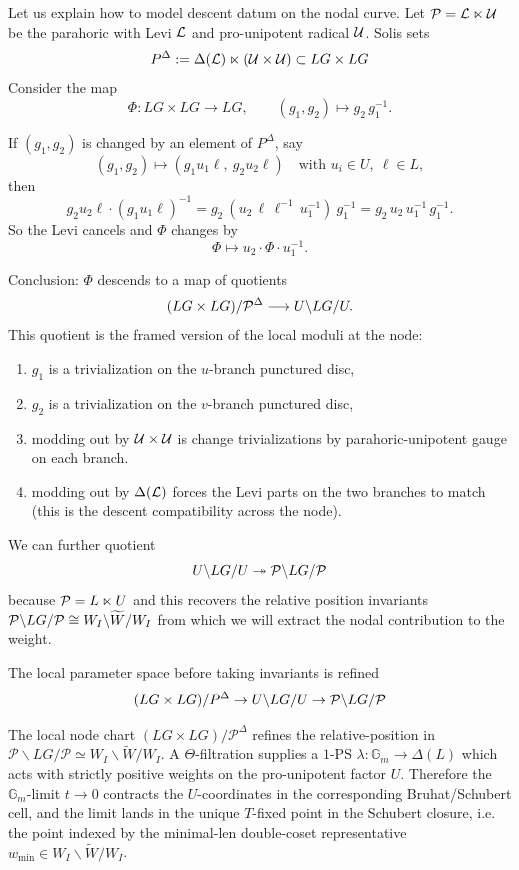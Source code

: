 \documentclass[12pt]{article}
\begin{document}
Let us explain how to model descent datum on the nodal curve. 
Let ${\mathcal{P}}= {\mathcal{L}}\ltimes {\mathcal{U}}$ be the parahoric with Levi ${\mathcal{L}}$ and pro-unipotent radical ${\mathcal{U}}$. Solis sets
\[
P^\Delta := \Delta({\mathcal{L}}) \ltimes ({\mathcal{U}}\times {\mathcal{U}}) \subset LG\times LG\]
Consider the map
\[
\Phi: LG\times LG \longrightarrow LG, \qquad (g_1,g_2)\longmapsto g_2\,g_1^{-1}.
\]

If $(g_1,g_2)$ is changed by an element of $P^\Delta$, say
\[
(g_1,g_2)\mapsto (g_1 u_1 \ell,\ g_2 u_2 \ell)
\quad\text{with }u_i\in U,\ \ell\in L,
\]
then
\[
g_2 u_2 \ell \cdot (g_1 u_1 \ell)^{-1}
=
g_2\ (u_2 \,\ell\,\ell^{-1}\,u_1^{-1})\ g_1^{-1}
=
g_2\,u_2\,u_1^{-1}\,g_1^{-1}.
\]
So the Levi cancels and $\Phi$ changes by
\[
\Phi \mapsto u_2\cdot \Phi \cdot u_1^{-1}.
\]

Conclusion: $\Phi$ descends to a map of quotients
\[
(LG\times LG)/{\mathcal{P}}^\Delta \longrightarrow U\backslash LG/U.
\]
This quotient is the framed version of the local moduli at the node:
\begin{enumerate}
    \item $g_1$ is a trivialization on the $u$-branch punctured disc,
    \item $g_2$ is a trivialization on the $v$-branch punctured disc,
    \item modding out by ${\mathcal{U}}\times{\mathcal{U}}$ is change trivializations by parahoric-unipotent gauge on each branch.
    \item modding out by $\Delta({\mathcal{L}})$ forces the Levi parts on the two branches to match (this is the descent compatibility across the node).
\end{enumerate}



We can further quotient
\[
U\backslash LG/U \twoheadrightarrow {\mathcal{P}}\backslash LG/{\mathcal{P}}
\]
because ${\mathcal{P}}=L\ltimes U$ and this recovers the relative position invariants ${\mathcal{P}}\backslash LG/{\mathcal{P}} \cong W_I\backslash \widetilde{W}/W_I$ from which we will extract the nodal contribution to the weight.

The local parameter space before taking invariants is refined
\[(LG\times LG)/P^\Delta \to U\backslash LG/U \to {\mathcal{P}}\backslash LG/{\mathcal{P}}\]

The local node chart $(LG\times LG)/\mathcal{P}^\Delta$ refines the relative-position in $\mathcal{P}\backslash LG/\mathcal{P}\simeq W_I\backslash\widetilde{W}/W_I$. A $\Theta$-filtration supplies a $1$-PS $\lambda:\mathbb{G}_m\to \Delta(L)$ which acts with strictly positive weights on the pro-unipotent factor $U$. Therefore the $\mathbb{G}_m$-limit $t\to 0$ contracts the $U$-coordinates in the corresponding Bruhat/Schubert cell, and the limit lands in the unique $T$-fixed point in the Schubert closure, i.e. the point indexed by the minimal-len double-coset representative $w_{\min}\in W_I\backslash\widetilde{W}/W_I$.
\end{document}
